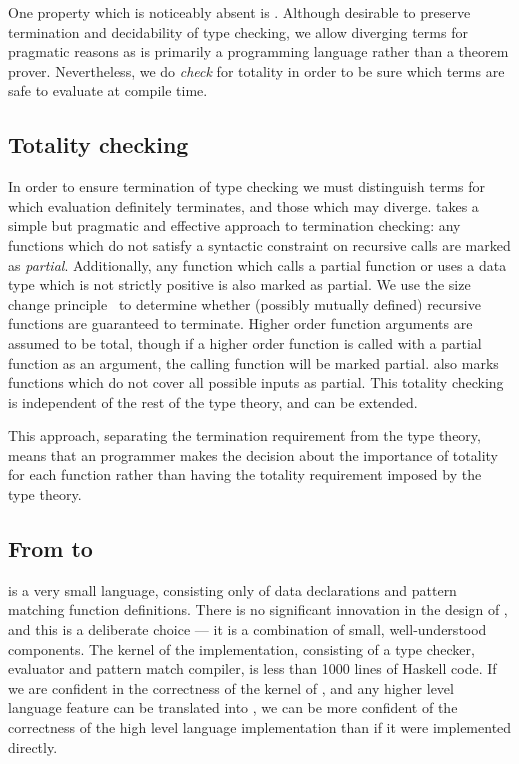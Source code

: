 One property which is noticeably absent is .
Although desirable to preserve termination and decidability of type checking,
we allow diverging terms for pragmatic reasons as \Idris{} is primarily a
programming language rather than a theorem prover. Nevertheless, we do
\emph{check} for totality in order to be sure which terms are safe to
evaluate at compile time.

\subsection{Totality checking}

In order to ensure termination of type checking we must distinguish terms for
which evaluation definitely terminates, and those which may diverge. \TT{}
takes a simple but pragmatic and effective approach to termination checking:
any functions which do not satisfy a syntactic constraint on recursive calls
are marked as \emph{partial}. Additionally, any function which calls a partial
function or uses a data type which is not strictly positive is also marked as
partial. We use the size change principle~\cite{Lee2001} to determine whether
(possibly mutually defined) recursive functions are guaranteed to
terminate.  Higher order function arguments are assumed to be total, though
if a higher order function is called with a partial function as an argument,
the calling function will be marked partial.
\TT{} also marks functions which do not cover
all possible inputs as partial. This totality checking is independent of the
rest of the type theory, and can be extended.

This approach, separating the termination requirement from the type theory,
means that an \Idris{} programmer makes the decision about the importance of
totality for each function rather than having the totality requirement imposed
by the type theory.

\subsection{From \Idris{} to \TT{}}

\TT{} is a very small language, consisting only of data declarations and pattern matching
function definitions. There is no significant innovation in the design of \TT{}, and this
is a deliberate choice --- it is a combination of small, well-understood components.
The kernel of the \TT{} implementation, consisting of a type checker, evaluator and
pattern match compiler, is less than 1000 lines of Haskell code. If we are confident
in the correctness of the kernel of \TT{}, and any higher level language feature
can be translated into \TT{}, we can be more confident of the correctness of the high
level language implementation than if it were implemented directly.

